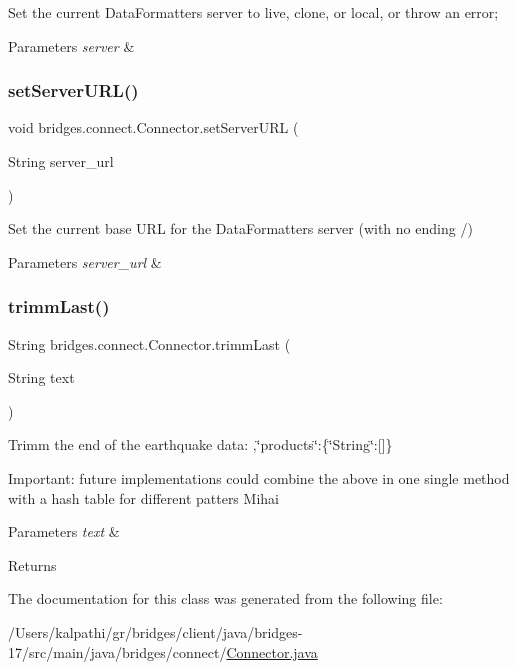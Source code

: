 Set the current Data\+Formatters server to live, clone, or local, or throw an error; 
\begin{DoxyParams}{Parameters}
{\em server} & \\
\hline
\end{DoxyParams}
\mbox{\label{classbridges_1_1connect_1_1_connector_a71f449c91e529f79730df27e01fdf674}} 
\subsubsection{\texorpdfstring{set\+Server\+U\+R\+L()}{setServerURL()}}
{\footnotesize\ttfamily void bridges.\+connect.\+Connector.\+set\+Server\+U\+RL (\begin{DoxyParamCaption}\item[{String}]{server\+\_\+url }\end{DoxyParamCaption})}

Set the current base U\+RL for the Data\+Formatters server (with no ending /) 
\begin{DoxyParams}{Parameters}
{\em server\+\_\+url} & \\
\hline
\end{DoxyParams}
\mbox{\label{classbridges_1_1connect_1_1_connector_ac0dca0bd99b6abbbd8a77874a95e6d49}} 
\subsubsection{\texorpdfstring{trimm\+Last()}{trimmLast()}}
{\footnotesize\ttfamily String bridges.\+connect.\+Connector.\+trimm\+Last (\begin{DoxyParamCaption}\item[{String}]{text }\end{DoxyParamCaption})}

Trimm the end of the earthquake data\+: ,\char`\"{}products\char`\"{}\+:\{\char`\"{}\+String\char`\"{}\+:\mbox{[}\mbox{]}\}

Important\+: future implementations could combine the above in one single method with a hash table for different patters Mihai 
\begin{DoxyParams}{Parameters}
{\em text} & \\
\hline
\end{DoxyParams}
\begin{DoxyReturn}{Returns}

\end{DoxyReturn}


The documentation for this class was generated from the following file\+:\begin{DoxyCompactItemize}
\item 
/\+Users/kalpathi/gr/bridges/client/java/bridges-\/17/src/main/java/bridges/connect/\mbox{\hyperlink{_connector_8java}{Connector.\+java}}\end{DoxyCompactItemize}
